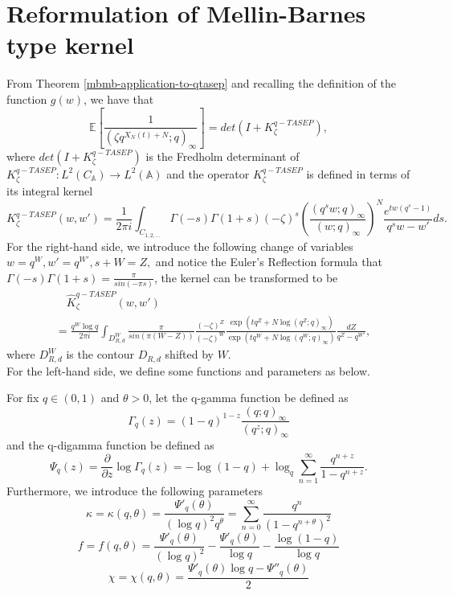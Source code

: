 \section{Reformulation of Mellin-Barnes type kernel}
From Theorem \ref{mbmb-application-to-qtasep} and recalling the definition of the function $g(w)$, we have that 
\begin{equation}
\label{continuation-equation}
\mathbb{E} \left[ \frac{1}{(\zeta q^{X_N(t)+N}; q)_{\infty}} \right] = det(I+K_{\zeta}^{q-TASEP}),
\end{equation}
where $det(I+K_{\zeta}^{q-TASEP})$ is the Fredholm determinant of $K_{\zeta}^{q-TASEP}: L^2(C_{\mathbb{A}}) \rightarrow L^2(\mathbb{A})$ and the operator $K_{\zeta}^{q-TASEP}$ is defined in terms of its integral kernel
$$K_{\zeta}^{q-TASEP}(w,w') = \frac{1}{2 \pi i} \int_{C_{1,2,\dots}} \Gamma(-s) \Gamma(1+s) (-\zeta)^s \left(\frac{(q^s w; q)_{\infty}}{(w;q)_{\infty}}\right)^N \frac{e^{tw(q^s-1)}}{q^sw - w'} ds.$$
For the right-hand side, we introduce the following change of variables $w = q^W, w' = q^{W'}, s+W = Z,$ and notice the Euler's Reflection formula that $\Gamma(-s) \Gamma(1+s) = \frac{\pi}{sin(-\pi s)}$, the kernel can be transformed to be 
\begin{align*}
& \quad \hat{K}_{\zeta}^{q-TASEP}(w,w') \\
& = \frac{q^W \log q}{2 \pi i} \int_{D^W_{R,d}} \frac{\pi}{sin(\pi (W-Z))} \frac{(-\zeta)^Z}{(-\zeta)^W} \frac{\exp(tq^Z+N\log(q^Z;q)_{\infty})}{\exp(tq^W+N\log(q^W;q)_{\infty})} \frac{dZ}{q^Z - q^{W'}},
\end{align*}
where $D^W_{R,d}$ is the contour $D_{R,d}$ shifted by $W$.\\

For the left-hand side, we define some functions and parameters as below.
\begin{definition}
For fix $q \in (0,1)$ and $\theta > 0$, let the q-gamma function be defined as $$\Gamma_q(z) = (1-q)^{1-z} \frac{(q;q)_{\infty}}{(q^z;q)_{\infty}}$$ and the q-digamma function be defined as $$\Psi_q(z) = \frac{\partial}{\partial z} \log \Gamma_q(z) = -\log(1-q) + \log_q \sum_{n=1}^{\infty} \frac{q^{n+z}}{1 - q^{n+z}}.$$
Furthermore, we introduce the following parameters
\begin{equation*}
\kappa = \kappa(q,\theta) = \frac{\Psi'_q(\theta)}{(\log q)^2 q^{\theta}} = \sum_{n=0}^{\infty} \frac{q^n}{(1-q^{n+\theta})^2}
\end{equation*}
\begin{equation*}
f = f(q,\theta) = \frac{\Psi'_q(\theta)}{(\log q)^2} - \frac{\Psi'_q(\theta)}{\log q} - \frac{\log(1-q)}{\log q}
\end{equation*}
\begin{equation*}
\chi = \chi(q,\theta) = \frac{\Psi'_q(\theta) \log q - \Psi''_q(\theta)}{2}
\end{equation*}
\end{definition}

